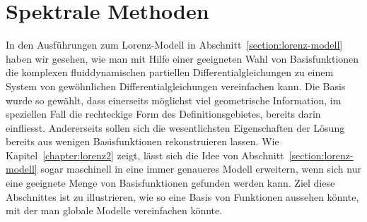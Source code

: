 %
%
%
\section{Spektrale Methoden\label{section:spektrale methoden}}
In den Ausführungen zum Lorenz-Modell in Abschnitt~\ref{section:lorenz-modell}
haben wir gesehen, wie man mit Hilfe einer geeigneten Wahl von Basisfunktionen
die komplexen fluiddynamischen partiellen Differentialgleichungen zu einem
System von gewöhnlichen Differentialgleichungen vereinfachen kann.
Die Basis wurde so gewählt, dass einerseits möglichst viel geometrische
Information, im speziellen Fall die rechteckige Form des Definitionsgebietes,
bereits darin einfliesst.
Andererseits sollen sich die wesentlichsten Eigenschaften der Lösung bereits
aus wenigen Basisfunktionen rekonstruieren lassen.
Wie Kapitel~\ref{chapter:lorenz2} zeigt, lässt sich die Idee von
Abschnitt~\ref{section:lorenz-modell} sogar maschinell in eine
immer genaueres Modell erweitern, wenn sich nur eine geeignete Menge
von Basisfunktionen gefunden werden kann.
Ziel diese Abschnittes ist zu illustrieren, wie so eine Basis von
Funktionen aussehen könnte, mit der man globale Modelle vereinfachen
könnte.






